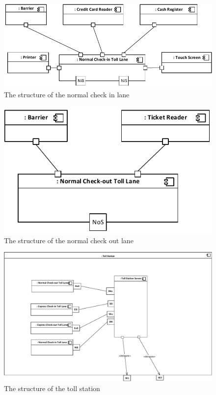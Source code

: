 \begin{figure}
\centerline{\includegraphics[width=\textwidth]{img/composite_structure_diagrams/cscd_toll_lane_normal_in}}
\caption{The structure of the normal check in lane}
\label{fig:csd_tlni}
\end{figure}

\begin{figure}
\centerline{\includegraphics[width=\textwidth]{img/composite_structure_diagrams/cscd_toll_lane_normal_out}}
\caption{The structure of the normal check out lane}
\label{fig:csd_tlno}
\end{figure}


\begin{figure}
\centerline{\includegraphics[width=\textwidth]{img/composite_structure_diagrams/cscd_toll_station}}
\caption{The structure of the toll station}
\label{fig:csd_ts}
\end{figure}
